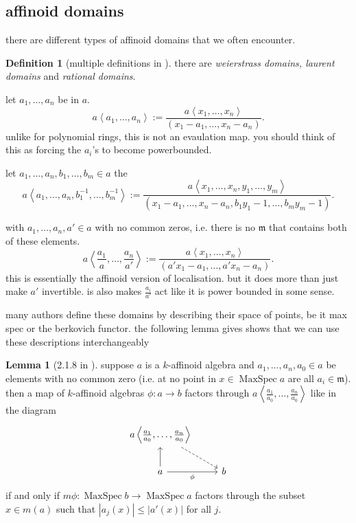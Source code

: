 \documentclass[a4paper]{report}
\DeclareMathOperator{\maxspec}{MaxSpec}
\theoremstyle{definition}
\newtheorem*{lemma}{Lemma}
\newtheorem*{definition}{Definition}
\begin{document}
\subsection{affinoid domains} \label{sec:affinoid_domains}

there are different types of affinoid domains that we often encounter. 

\begin{definition}[multiple definitions in \cite{conrad2008several}]
		there are \emph{weierstrass domains, laurent domains} and \emph{rational domains}. 
	\begin{description}
		\item[weierstrass domain] let $a_1, \ldots, a_n$ be in $a$. 
			\[
				a\left<a_1, \ldots, a_n \right> := \frac{a\left<x_1, \ldots, x_n \right>}{(x_1-a_1, \ldots, x_n - a_n)}
			.\] 
			unlike for polynomial rings, this is not an evaulation map. you should think of this as forcing the $a_i$'s to become powerbounded. 
		\item [laurent domains]
			let $a_1, \ldots, a_n, b_1, \ldots, b_m \in a$ the \[
				a\left<a_1, \ldots, a_n, b_1^{-1}, \ldots, b_m^{-1} \right> := \frac{a\left<x_1, \ldots, x_n,y_1, \ldots, y_m  \right>}{(x_1 - a_1, \ldots, x_n - a_n, b_1 y_1 - 1, \ldots, b_m y_m - 1)}
			.\] 
		\item[rational domain] with $a_1, \ldots, a_n, a' \in a$ with no common zeros, i.e. there is no $\mathfrak{m} $ that contains both of these elements.   
			\[
				a \left<\frac{a_1}{a}, \ldots, \frac{a_n}{a'} \right> := \frac{a\left<x_1, \ldots, x_n \right>}{(a' x_1 - a_1, \ldots, a' x_n - a_n)}
			.\] 
			this is essentially the affinoid version of localisation.
			but it does more than just make $a'$ invertible. 
			is also makes $\frac{a_i}{ a'}$ act like it is power bounded in some sense. 
		\item 
	\end{description}

\end{definition}
many authors define these domains by describing their space of points, be it max spec or the berkovich functor. 
the following lemma gives shows that we can use these descriptions interchangeably
\begin{lemma}
	[2.1.8 in \cite{conrad2008several}]
	suppose $a$ is a $k$-affinoid algebra and $a_1, \ldots, a_n, a_0 \in a$ be elements with no common zero (i.e. at no point in $ x \in \maxspec a$ are all $a_{i} \in \mathfrak{m}$).
	 then a map of $k$-affinoid algebras $\phi: a \to b$ factors through $a \left<\frac{a_1}{a_0}, \ldots, \frac{a_n}{a_0} \right>$ like in the diagram \[
	 \begin{tikzcd}
		 a \left<\frac{a_1}{a_0}, \ldots, \frac{a_n}{a_0} \right> \drar[dashed]  \\
		 a \uar \rar[']{\phi} & b
	 \end{tikzcd}
	 \] 
	 if and only if  $m\phi: \maxspec b \to \maxspec a$ factors through the subset $x \in m(a)$ such that $|a_j(x)| \le |a'(x)|$ for all $j$. 
\end{lemma}
\end{document}
